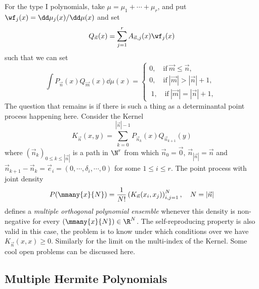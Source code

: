 For the type I polynomials, take $\mu = \mu_1 + \cdots + \mu_r$, and put $\wf_j(x) = \dd \mu_j(x) / \dd \mu(x)$ and set
\begin{equation}
	Q_{\vec{n}}(x) = \sum_{j=1}^{r} A_{\vec{n}, j}(x) \wf_j(x)
\end{equation}
such that we can set
\begin{equation}
	\int P_{\vec{n}}(x) Q_{\vec{m}}(x) \dd \mu(x) = 
	\begin{cases}
		0, \quad \text{if} \ \vec{m} \leq \vec{n},\\
		0, \quad \text{if} \ |\vec{m}| > |\vec{n}|+ 1,\\\
		1, \quad \text{if} \ |\vec{m}| = |\vec{n}| + 1,\
	\end{cases}
\end{equation}
The question that remains is if there is such a thing as a determinantal point process happening here. Consider the Kernel 
\begin{equation}
	K_{\vec{n}}(x, y)  = \sum_{k=0}^{|\vec{n}|-1} P_{\vec{n}_k}(x) Q_{\vec{n}_{k+1}}(y) 
\end{equation}
where $(\vec{n}_k)_{0 \leq k \leq |\vec{n}|}$ is a path in $\N^r$ from which $\vec{n}_0 = \vec{0}$, $\vec{n}_{|\vec{n}|} = \vec{n}$ and $\vec{n}_{k+1}  - \vec{n}_k = \vec{e}_i = (0, \cdots, \delta_i, \cdots, 0)$ for some $1 \leq i \leq r$. The point process with joint density 
\begin{equation}
	P(\mmany{x}{N}) = \frac{1}{N!} \left( K_{\vec{n}}(x_i, x_j) \right)_{i,j=1}^N, \quad N = |\vec{n}|
\end{equation}
defines a \textit{multiple orthogonal polynomial ensemble} whenever this density is non-negative for every $(\mmany{x}{N}) \in \R^N$. The self-reproducing property is also valid in this case, the problem is to know under which conditions over  we have $K_{\vec{n}}(x,x) \geq 0$. Similarly for the limit on the multi-index of the Kernel. Some cool open problems can be discussed here.

\subsection{Multiple Hermite Polynomials}

